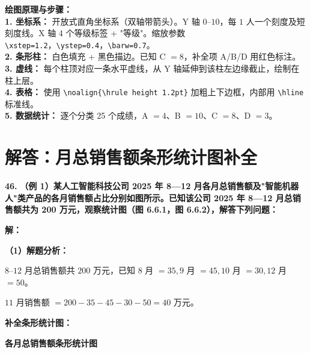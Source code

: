 \vspace{0.4cm}
{\small\color{blue!70!black}
\textbf{绘图原理与步骤：}\\
\textbf{1. 坐标系：} 开放式直角坐标系（双轴带箭头）。Y 轴 $0$--$10$，每 $1$ 人一个刻度及短刻度线。X 轴 4 个等级标签 + "等级"。缩放参数 \texttt{\textbackslash{}xstep=1.2}，\texttt{\textbackslash{}ystep=0.4}，\texttt{\textbackslash{}barw=0.7}。\\
\textbf{2. 条形柱：} 白色填充 + 黑色描边。已知 C $= 8$，补全项 A/B/D 用红色标注。\\
\textbf{3. 虚线：} 每个柱顶对应一条水平虚线，从 Y 轴延伸到该柱左边缘截止，绘制在柱上层。\\
\textbf{4. 表格：} 使用 \texttt{\textbackslash{}noalign\{\textbackslash{}hrule height 1.2pt\}} 加粗上下边框，内部用 \texttt{\textbackslash{}hline} 标准线。\\
\textbf{5. 数据统计：} 逐个分类 25 个成绩，A $= 4$$、$B $= 10$$、$C $= 8$$、$D $= 3$。
}

\newpage



\section{解答：月总销售额条形统计图补全}

\vspace{0.6cm}

\textbf{\LARGE 46.} \textbf{（例 1）某人工智能科技公司 2025 年 8—12 月各月总销售额及"智能机器人"类产品的各月销售额占比分别如图所示。已知该公司 2025 年 8—12 月总销售额共为 200 万元，观察统计图（图 6.6.1，图 6.6.2），解答下列问题：}

\vspace{0.4cm}
\textbf{解：}

\textbf{（1）解题分析：}

$8$--$12$ 月总销售额共 $200$ 万元，已知 $8$ 月 $= 35, 9$ 月 $= 45, 10$ 月 $= 30, 12$ 月 $= 50$。

$11$ 月销售额 $= 200 - 35 - 45 - 30 - 50 = 40$ 万元。

\vspace{0.2cm}
\textbf{补全条形统计图：}

\begin{center}
{\textbf{各月总销售额条形统计图}}
\end{center}

